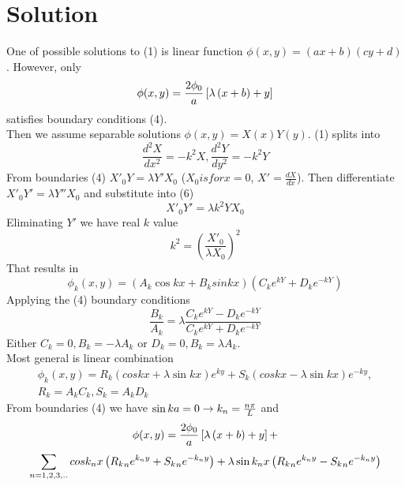 \documentclass[a4paper]{article}
\begin{document}
\section{Solution}
One of possible solutions to (1) is linear function $\phi(x,y) = (a x + b) ( c y + d) $. However, only 
\begin{equation}
\phi(x,y) = {2 \phi_0 \over a} \left[ \lambda \left( x + b \right)  + y \right]
\end{equation}
satisfies boundary conditions (4). \\
Then we assume separable solutions $\phi(x,y) = X(x) Y(y)$. (1) splits into 
\begin{equation}
\frac{d^2 X}{dx^2} = - k^2 X, \frac{d^2 Y}{dy^2} = - k^2 Y 
\end{equation}
From boundaries (4) $X'_0 Y = \lambda Y' X_0$ ($X_0 is for x = 0$, $X' = \frac{dX}{dx}$). Then differentiate $X'_0 Y' = \lambda Y'' X_0$ and substitute into (6)
\begin{equation}
X'_0 Y' = \lambda k^2 Y X_0
\end{equation}
Eliminating $Y'$ we have real $k$ value
\begin{equation}
k^2 = \left( \frac{X'_0}{\lambda X_0} \right) ^2 
\end{equation}
That results in 
\begin{equation}
\phi_k(x,y) = \left(A_k \cos k x + B_k sin k x \right) \left(C_k e^{k Y} + D_k e^{-k Y} \right)
\end{equation}
Applying the (4) boundary conditions 
\begin{equation}
\frac{B_k}{A_k} = \lambda \frac{C_k e^{k Y} - D_k e^{-k Y} }{C_k e^{k Y} + D_k e^{-k Y} }
\end{equation}
Either $C_k = 0, B_k = - \lambda A_k$ or $D_k = 0, B_k = \lambda A_k$. \\
Most general is linear combination 
\begin{equation}
\begin{split}
\phi_k(x,y) = R_k \left( cos k x + \lambda \sin k x \right) e^{k y} + S_k \left( cos k x - \lambda \sin k x \right) e^{-k y}, \\
R_k = A_k C_k, S_k = A_k D_k
\end{split}
\end{equation}
From boundaries (4) we have $\sin k a = 0 \rightarrow k_n = {n \pi \over L}$ and 
\begin{multline}
\phi(x,y) = { 2 \phi_0 \over a} \left[  \lambda  \left( x + b \right) + y \right] + \\ 
\sum_{n = 1,2,3,..}^{}    cos k_n x \left( {R_k}_n e^{k_n y} + {S_k}_n e^{-k_n y} \right) + \lambda \sin k_n x \left( {R_k}_n e^{k_n y} - {S_k}_n e^{-k_n y} \right) 
\end{multline}
\end{document}
